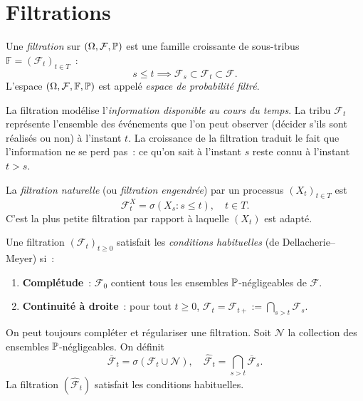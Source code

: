 \section{Filtrations}

\begin{definition}[Filtration]
\label{def:filtration}
Une \emph{filtration} sur $(\Omega, \mathcal{F}, \mathbb{P})$ est une famille croissante
de sous-tribus $\mathbb{F} = (\mathcal{F}_t)_{t \in T}$~:
\[
  s \leq t \implies \mathcal{F}_s \subset \mathcal{F}_t \subset \mathcal{F}.
\]
L'espace $(\Omega, \mathcal{F}, \mathbb{F}, \mathbb{P})$ est appel\'e \emph{espace de
probabilit\'e filtr\'e}.
\end{definition}

\begin{intuition}[title=\textbf{Information croissante}]
La filtration mod\'elise l'\emph{information disponible au cours du temps}.
La tribu $\mathcal{F}_t$ repr\'esente l'ensemble des \'ev\'enements que l'on peut
observer (d\'ecider s'ils sont r\'ealis\'es ou non) \`a l'instant $t$. La croissance
de la filtration traduit le fait que l'information ne se perd pas~: ce qu'on sait
\`a l'instant $s$ reste connu \`a l'instant $t > s$.
\end{intuition}

\begin{definition}
La \emph{filtration naturelle} (ou \emph{filtration engendr\'ee}) par un processus
$(X_t)_{t \in T}$ est
\[
  \mathcal{F}_t^X = \sigma(X_s : s \leq t), \quad t \in T.
\]
C'est la plus petite filtration par rapport \`a laquelle $(X_t)$ est adapt\'e.
\end{definition}

\begin{definition}
\label{def:conditions_habituelles}
Une filtration $(\mathcal{F}_t)_{t \geq 0}$ satisfait les \emph{conditions
habituelles} (de Dellacherie--Meyer) si~:
\begin{enumerate}
  \item \textbf{Compl\'etude}~: $\mathcal{F}_0$ contient tous les ensembles
    $\mathbb{P}$-n\'egligeables de $\mathcal{F}$.
  \item \textbf{Continuit\'e \`a droite}~: pour tout $t \geq 0$,
    $\mathcal{F}_t = \mathcal{F}_{t+} := \bigcap_{s > t} \mathcal{F}_s$.
\end{enumerate}
\end{definition}

\begin{remarque}
On peut toujours \og compl\'eter \fg et \og r\'egulariser \fg une filtration.
Soit $\mathcal{N}$ la collection des ensembles $\mathbb{P}$-n\'egligeables. On d\'efinit
\[
  \overline{\mathcal{F}}_t = \sigma(\mathcal{F}_t \cup \mathcal{N}), \quad
  \widehat{\mathcal{F}}_t = \bigcap_{s > t} \overline{\mathcal{F}}_s.
\]
La filtration $(\widehat{\mathcal{F}}_t)$ satisfait les conditions habituelles.
\end{remarque}

